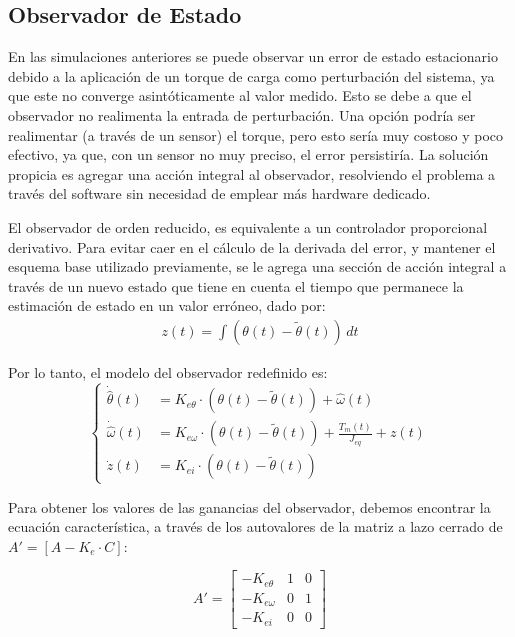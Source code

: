 \documentclass{article}
\begin{document}
\subsection{Observador de Estado}


En las simulaciones anteriores se puede observar un error de estado estacionario debido a la aplicaci\'on de un torque de carga como perturbaci\'on del sistema, ya que este no converge asint\'oticamente al valor medido. Esto se debe a que el observador no realimenta la entrada de perturbaci\'on. Una opci\'on podr\'ia ser realimentar (a trav\'es de un sensor) el torque, pero esto ser\'ia muy costoso y poco efectivo, ya que, con un sensor no muy preciso, el error persistir\'ia. La soluci\'on propicia es agregar una acci\'on integral al observador, resolviendo el problema a trav\'es del software sin necesidad de emplear m\'as hardware dedicado.

El observador de orden reducido, es equivalente a un controlador proporcional derivativo. Para evitar caer en el c\'alculo de la derivada del error, y mantener el esquema base utilizado previamente, se le agrega una secci\'on de acci\'on integral a trav\'es de un nuevo estado que tiene en cuenta el tiempo que permanece la estimaci\'on de estado en un valor err\'oneo, dado por:
\begin{equation}
\begin{aligned}
z(t) = \int (\theta(t) - \tilde{\theta}(t))\,dt
\end{aligned}
\end{equation}

Por lo tanto, el modelo del observador redefinido es:
\begin{equation}
\left\{
\begin{aligned}
\dot{\hat{\theta}}(t) &= K_{e\theta} \cdot (\theta(t) - \tilde{\theta}(t)) + \hat{\omega}(t) \\
\dot{\hat{\omega}}(t) &= K_{e\omega} \cdot (\theta(t) - \tilde{\theta}(t)) + \frac{T_m(t)}{J_{eq}} + z(t) \\
\dot{z}(t) &= K_{ei} \cdot (\theta(t) - \tilde{\theta}(t))
\end{aligned}
\right.
\end{equation}

Para obtener los valores de las ganancias del observador, debemos encontrar la ecuaci\'on caracter\'istica, a trav\'es de los autovalores de la matriz a lazo cerrado de $A' = [A - K_e \cdot C]$:

\begin{equation}
A' = \begin{bmatrix}
-K_{e\theta} & 1 & 0 \\
-K_{e\omega} & 0 & 1 \\
-K_{ei} & 0 & 0
\end{bmatrix}
\end{equation}
\end{document}
